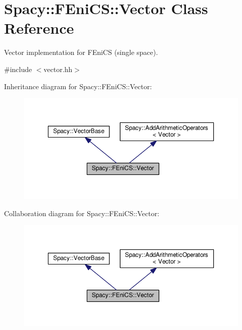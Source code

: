 \hypertarget{classSpacy_1_1FEniCS_1_1Vector}{}\section{Spacy\+:\+:F\+Eni\+C\+S\+:\+:Vector Class Reference}
\label{classSpacy_1_1FEniCS_1_1Vector}


Vector implementation for F\+Eni\+C\+S (single space).  




{\ttfamily \#include $<$vector.\+hh$>$}



Inheritance diagram for Spacy\+:\+:F\+Eni\+C\+S\+:\+:Vector\+:\nopagebreak
\begin{figure}[H]
\begin{center}
\leavevmode
\includegraphics[width=350pt]{classSpacy_1_1FEniCS_1_1Vector__inherit__graph}
\end{center}
\end{figure}


Collaboration diagram for Spacy\+:\+:F\+Eni\+C\+S\+:\+:Vector\+:\nopagebreak
\begin{figure}[H]
\begin{center}
\leavevmode
\includegraphics[width=350pt]{classSpacy_1_1FEniCS_1_1Vector__coll__graph}
\end{center}
\end{figure}
